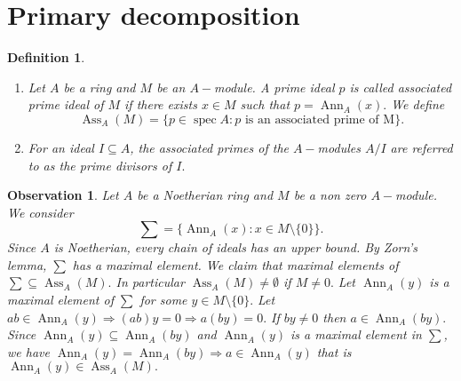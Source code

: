 \documentclass[11pt]{amsart}
\newtheorem{defn}[theorem]{Definition}
\newtheorem{obs}[theorem]{Observation}
\DeclareMathOperator{\ann}{\text{Ann}}
\DeclareMathOperator{\ass}{\text{Ass}}
\DeclareMathOperator{\spec}{\text{spec}}
\begin{document}
\newpage
\section{Primary decomposition}

\begin{defn}

\begin{enumerate}

\item Let $A$ be a ring and $M$ be an $A-$module. A prime ideal $p$ is called associated prime ideal of $M$ if there exists $x\in M$ such that $p=\ann_A(x).$ We define $$\ass_A(M)=\{p\in\spec A:p\text{ is an associated prime of M}\}.$$

\item For an ideal $I\subseteq A$, the associated primes of the $A-$modules $A/I$ are referred to as the prime divisors of $I.$

\end{enumerate}

\end{defn}

\begin{obs}

Let $A$ be a Noetherian ring and $M$ be a non zero $A-$module. We consider $$\sum=\{\ann_A(x):x\in M\setminus\{0\}\}.$$ Since $A$ is Noetherian, every chain of ideals has an upper bound. By Zorn's lemma, $\displaystyle\sum$ has a maximal element. We claim that maximal elements of $\displaystyle\sum\subseteq \ass_A(M).$ In particular $\ass_A(M)\neq\emptyset$ if $M\neq 0.$ Let $\ann_A(y)$ is a maximal element of $\displaystyle\sum$ for some $y\in M\setminus\{0\}.$ Let $ab\in \ann_A(y) \Rightarrow (ab)y=0 \Rightarrow a(by)=0.$ If $by\neq 0$ then $a\in \ann_A(by).$ Since $\ann_A(y)\subseteq \ann_A(by)$ and $\ann_A(y)$ is a maximal element in $\displaystyle\sum$, we have $\ann_A(y)=\ann_A(by) \Rightarrow a\in \ann_A(y)$ that is $\ann_A(y)\in \ass_A(M).$

\end{obs}
\end{document}

